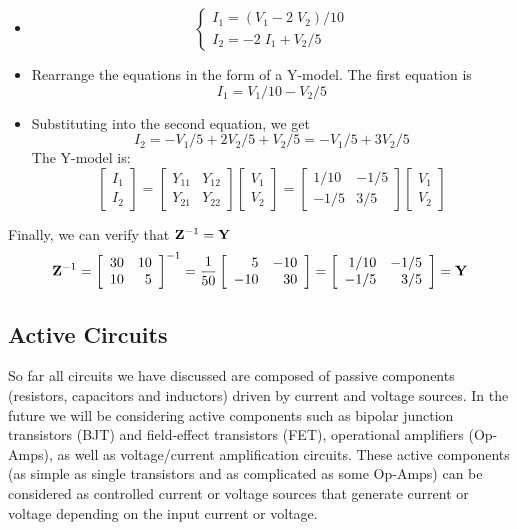 \begin{itemize}
\item
\[	\left\{ \begin{array}{l} 
	I_1=(V_1-2\;V_2)/10 \\ I_2=-2\;I_1+V_2/5 \end{array} \right. \]
\item Rearrange the equations in the form of a Y-model. The first equation is
\[	I_1=V_1/10-V_2/5	\]
\item Substituting into the second equation, we get
\[	I_2=-V_1/5+2V_2/5+V_2/5=-V_1/5+3V_2/5	\]
The Y-model is:
\[	\left[ \begin{array}{l} I_1 \\ I_2 \end{array} \right]=
	\left[ \begin{array}{rr} Y_{11} & Y_{12} \\ Y_{21} & Y_{22} \end{array} \right]
	\left[ \begin{array}{l} V_1 \\ V_2 \end{array} \right]
=	\left[ \begin{array}{rr} 1/10 & -1/5 \\ -1/5 & 3/5 \end{array} \right]
	\left[ \begin{array}{l} V_1 \\ V_2 \end{array} \right] \]
\end{itemize}
Finally, we can verify that ${\bf Z}^{-1}={\bf Y}$
\[ {\bf Z}^{-1}=\left[ \begin{array}{rr} 30 & 10 \\ 10 & 5 \end{array} \right]^{-1}
	=\frac{1}{50}\left[ \begin{array}{rr} 5 & -10 \\ -10 & 30 \end{array} \right]
	=\left[ \begin{array}{rr} 1/10 & -1/5 \\ -1/5 & 3/5 \end{array} \right]
	={\bf Y}	\]

\subsection*{Active Circuits}

So far all circuits we have discussed are composed of passive components 
(resistors, capacitors and inductors) driven by current and voltage sources.
In the future we will be considering active components such as bipolar junction
transistors (BJT) and field-effect transistors (FET), operational amplifiers 
(Op-Amps), as well as voltage/current amplification circuits. These active 
components (as simple as single transistors and as complicated as some Op-Amps) 
can be considered as controlled current or voltage sources that generate current 
or voltage depending on the input current or voltage.

